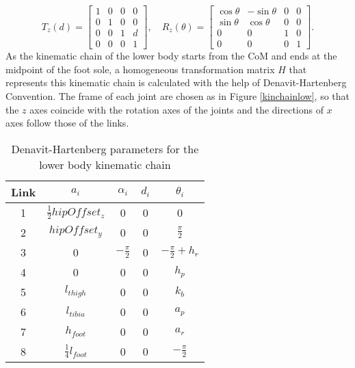 \begin{equation}
T_{z}(d)=
\begin{bmatrix}
1&0&0&0\\0&1&0&0\\0&0&1&d\\0&0&0&1
\end{bmatrix},
\quad
R_{z}(\theta)=
\begin{bmatrix}
\cos\theta&-\sin\theta&0&0\\\sin\theta&\cos\theta&0&0\\0&0&1&0\\0&0&0&1
\end{bmatrix}.
\end{equation}
As the kinematic chain of the lower body starts from the CoM and ends at the midpoint of the foot sole, a homogeneous transformation matrix $ H $ that represents this kinematic chain is calculated with the help of Denavit-Hartenberg Convention. The frame of each joint are chosen as in Figure {\ref{kinchainlow}}, so that the $ z $ axes coincide with the rotation axes of the joints and the directions of $ x $ axes follow those of the links.

\begin{table}[H]
	\centering
	\label{DHlow}
	\caption{Denavit-Hartenberg parameters for the lower body kinematic chain}
	\begin{tabular}{ccccc}
		\hline
		Link&$ a_i $&$ \alpha_i $&$  d_i$&$ \theta_i $\\
		\hline
		1&$ \frac{1}{2}\mathit{hipOffset_z} $&0&0&0\\
		\hline
		2&$ \mathit{hipOffset_y} $&0&0&$ \frac{\pi}{2} $\\
		\hline
		3&0&$ -\frac{\pi}{2} $&0&$ -\frac{\pi}{2}+h_r $\\
		\hline
		4&0&0&0&$ h_p $\\
		\hline
		5&$ l_{thigh} $&0&0&$ k_b $\\
		\hline
		6&$ l_{tibia} $&0&0&$ a_p $\\
		\hline
		7&$ h_{foot} $&0&0&$ a_r $\\
		\hline
		8&$ \frac{1}{4}l_{foot} $&0&0&$ -\frac{\pi}{2} $\\
		\hline
	\end{tabular}
\end{table}


